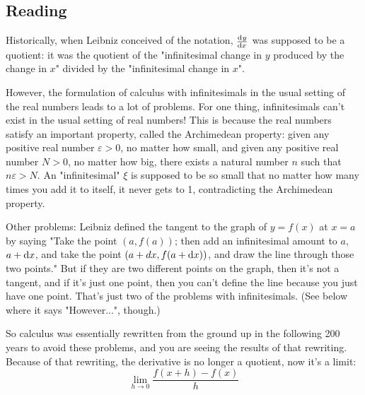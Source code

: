 


\subsection*{Reading}
Historically, when Leibniz conceived of the notation, $ \od{y}{x} $ was supposed to be a quotient: it was the quotient of the "infinitesimal change in $y$ produced by the change in $x$" divided by the "infinitesimal change in $x$".

However, the formulation of calculus with infinitesimals in the usual setting of the real numbers leads to a lot of problems. For one thing, infinitesimals can't exist in the usual setting of real numbers! This is because the real numbers satisfy an important property, called the Archimedean property: given any positive real number $ \varepsilon > 0 $, no matter how small, and given any positive real number $ N > 0 $, no matter how big, there exists a natural number $n$ such that $n \varepsilon > N$. An "infinitesimal" $ \xi $ is supposed to be so small that no matter how many times you add it to itself, it never gets to 1, contradicting the Archimedean property.

Other problems: Leibniz defined the tangent to the graph of $y=f(x)$ at $x=a$ by saying "Take the point $(a,f(a))$; then add an infinitesimal amount to $a$, $a+\dif{x}$, and take the point $(a+dx,f(a+\dif{x}))$, and draw the line through those two points." But if they are two different points on the graph, then it's not a tangent, and if it's just one point, then you can't define the line because you just have one point. That's just two of the problems with infinitesimals. (See below where it says "However...", though.)

So calculus was essentially rewritten from the ground up in the following 200 years to avoid these problems, and you are seeing the results of that rewriting. Because of that rewriting, the derivative is no longer a quotient, now it's a limit:
\begin{displaymath}
  \lim_{h \to 0} \frac{f(x + h) - f(x)}{h}
\end{displaymath}

